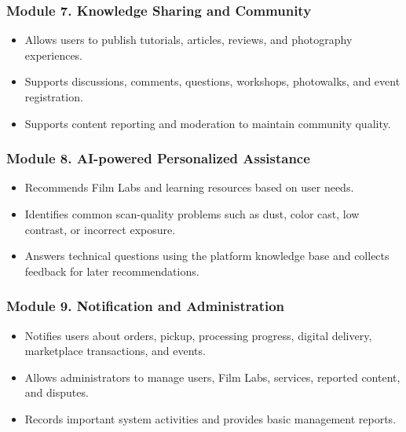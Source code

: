 \subsubsection*{Module 7. Knowledge Sharing and Community}
\begin{itemize}
    \item Allows users to publish tutorials, articles, reviews, and photography
    experiences.
    \item Supports discussions, comments, questions, workshops, photowalks, and
    event registration.
    \item Supports content reporting and moderation to maintain community
    quality.
\end{itemize}

\subsubsection*{Module 8. AI-powered Personalized Assistance}
\begin{itemize}
    \item Recommends Film Labs and learning resources based on user needs.
    \item Identifies common scan-quality problems such as dust, color cast, low
    contrast, or incorrect exposure.
    \item Answers technical questions using the platform knowledge base and
    collects feedback for later recommendations.
\end{itemize}

\subsubsection*{Module 9. Notification and Administration}
\begin{itemize}
    \item Notifies users about orders, pickup, processing progress, digital
    delivery, marketplace transactions, and events.
    \item Allows administrators to manage users, Film Labs, services, reported
    content, and disputes.
    \item Records important system activities and provides basic management
    reports.
\end{itemize}
